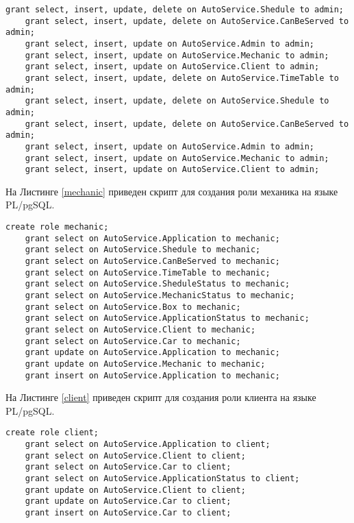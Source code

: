 \begin{lstlisting}[label=admin2, style=mystyle, caption=Скрипт для создания роли администратора на языке PL/pgSQL(ч. 2)]
	grant select, insert, update, delete on AutoService.Shedule to admin;
	grant select, insert, update, delete on AutoService.CanBeServed to admin;
	grant select, insert, update on AutoService.Admin to admin;
	grant select, insert, update on AutoService.Mechanic to admin;
	grant select, insert, update on AutoService.Client to admin;
	grant select, insert, update, delete on AutoService.TimeTable to admin;
	grant select, insert, update, delete on AutoService.Shedule to admin;
	grant select, insert, update, delete on AutoService.CanBeServed to admin;
	grant select, insert, update on AutoService.Admin to admin;
	grant select, insert, update on AutoService.Mechanic to admin;
	grant select, insert, update on AutoService.Client to admin;
\end{lstlisting}

На Листинге \ref{mechanic} приведен скрипт для создания роли механика на языке PL/pgSQL.

\newpage

\begin{lstlisting}[label=mechanic, style=mystyle, caption=Скрипт для создания роли механика на языке PL/pgSQL]
	create role mechanic;
	grant select on AutoService.Application to mechanic;
	grant select on AutoService.Shedule to mechanic;
	grant select on AutoService.CanBeServed to mechanic;
	grant select on AutoService.TimeTable to mechanic;
	grant select on AutoService.SheduleStatus to mechanic;
	grant select on AutoService.MechanicStatus to mechanic;
	grant select on AutoService.Box to mechanic;
	grant select on AutoService.ApplicationStatus to mechanic;
	grant select on AutoService.Client to mechanic;
	grant select on AutoService.Car to mechanic;
	grant update on AutoService.Application to mechanic;
	grant update on AutoService.Mechanic to mechanic;
	grant insert on AutoService.Application to mechanic;
\end{lstlisting}

На Листинге \ref{client} приведен скрипт для создания роли клиента на языке PL/pgSQL.

\begin{lstlisting}[label=client, style=mystyle, caption=Скрипт для создания роли клиента на языке PL/pgSQL]
	create role client;
	grant select on AutoService.Application to client;
	grant select on AutoService.Client to client;
	grant select on AutoService.Car to client;
	grant select on AutoService.ApplicationStatus to client;
	grant update on AutoService.Client to client;
	grant update on AutoService.Car to client;
	grant insert on AutoService.Car to client;
\end{lstlisting}

